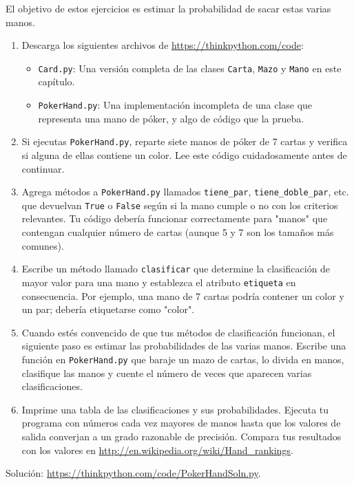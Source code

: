 El objetivo de estos ejercicios es estimar la probabilidad de sacar estas varias manos.

\begin{enumerate}
    \item Descarga los siguientes archivos de \url{https://thinkpython.com/code}:
    \begin{itemize}
        \item \texttt{Card.py}: Una versión completa de las clases \texttt{Carta}, \texttt{Mazo} y \texttt{Mano} en este capítulo.
        \item \texttt{PokerHand.py}: Una implementación incompleta de una clase que representa una mano de póker, y algo de código que la prueba.
    \end{itemize}
    \item Si ejecutas \texttt{PokerHand.py}, reparte siete manos de póker de 7 cartas y verifica si alguna de ellas contiene un color. Lee este código cuidadosamente antes de continuar.
    \item Agrega métodos a \texttt{PokerHand.py} llamados \texttt{tiene\_par}, \texttt{tiene\_doble\_par}, etc. que devuelvan \texttt{True} o \texttt{False} según si la mano cumple o no con los criterios relevantes. Tu código debería funcionar correctamente para "manos" que contengan cualquier número de cartas (aunque 5 y 7 son los tamaños más comunes).
    \item Escribe un método llamado \texttt{clasificar} que determine la clasificación de mayor valor para una mano y establezca el atributo \texttt{etiqueta} en consecuencia. Por ejemplo, una mano de 7 cartas podría contener un color y un par; debería etiquetarse como "color".
    \item Cuando estés convencido de que tus métodos de clasificación funcionan, el siguiente paso es estimar las probabilidades de las varias manos. Escribe una función en \texttt{PokerHand.py} que baraje un mazo de cartas, lo divida en manos, clasifique las manos y cuente el número de veces que aparecen varias clasificaciones.
    \item Imprime una tabla de las clasificaciones y sus probabilidades. Ejecuta tu programa con números cada vez mayores de manos hasta que los valores de salida converjan a un grado razonable de precisión. Compara tus resultados con los valores en \url{http://en.wikipedia.org/wiki/Hand_rankings}.
\end{enumerate}

Solución: \url{https://thinkpython.com/code/PokerHandSoln.py}.
